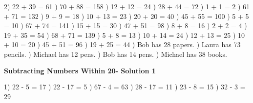\documentclass{article}%
\begin{document}
2) 22 + 39 = 61%
) 70 + 88 = 158%
) 12 + 12 = 24%
) 28 + 44 = 72%
) 1 + 1 = 2%
) 61 + 71 = 132%
) 9 + 9 = 18%
) 10 + 13 = 23%
) 20 + 20 = 40%
) 45 + 55 = 100%
) 5 + 5 = 10%
) 67 + 74 = 141%
) 15 + 15 = 30%
) 47 + 51 = 98%
) 8 + 8 = 16%
) 2 + 2 = 4%
) 19 + 35 = 54%
) 68 + 71 = 139%
) 5 + 8 = 13%
) 10 + 14 = 24%
) 12 + 13 = 25%
) 10 + 10 = 20%
) 45 + 51 = 96%
) 19 + 25 = 44%
) Bob has 28 papers.%
) Laura has 73 pencils.%
) Michael has 12 pens.%
) Bob has 14 pens.%
) Michael has 38 books.%
\newline%
\newpage%
\large%
\begin{center}%
\textbf{Subtracting Numbers Within 20- Solution 1}%
\newline%
\end{center} \normalsize%
1) 22 {-} 5 = 17%
) 22 {-} 17 = 5%
) 67 {-} 4 = 63%
) 28 {-} 17 = 11%
) 23 {-} 8 = 15%
) 32 {-} 3 = 29%
\newline%
\end{document}
